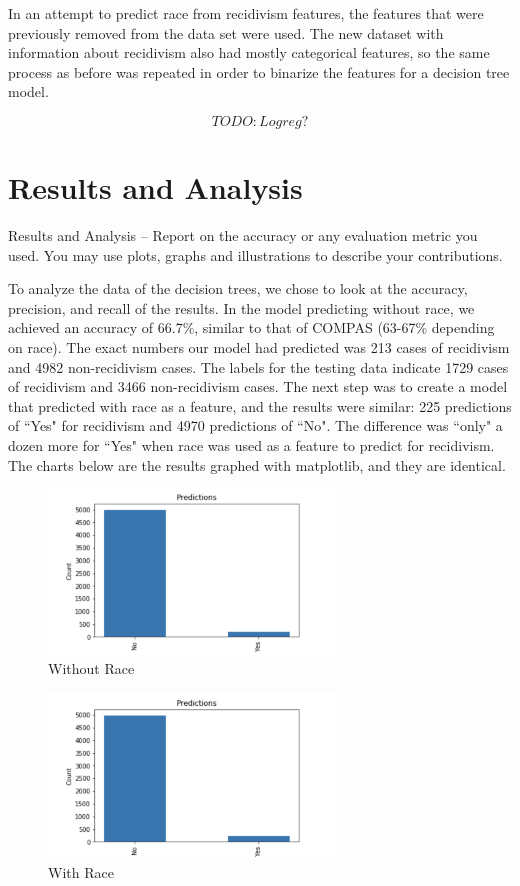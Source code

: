 \documentclass[11pt, sigconf]{acmart}
\begin{document}
In an attempt to predict race from recidivism features, the features that were previously removed from the data set were used. The new dataset with information about recidivism also had mostly categorical features, so the same process as before was repeated in order to binarize the features for a decision tree model.


$$TODO: Logreg ?$$




\section{Results and Analysis}
Results and Analysis – Report on the accuracy or any evaluation metric you used. You may use
plots, graphs and illustrations to describe your contributions.

To analyze the data of the decision trees, we chose to look at the accuracy, precision, and recall of the results. In the model predicting without race, we achieved an accuracy of 66.7\%, similar to that of COMPAS (63-67\% depending on race). The exact numbers our model had predicted was 213 cases of recidivism and 4982 non-recidivism cases. The labels for the testing data indicate 1729 cases of recidivism and 3466 non-recidivism cases. The next step was to create a model that predicted with race as a feature, and the results were similar: 225 predictions of ``Yes" for recidivism and 4970 predictions of ``No". The difference was ``only" a dozen more for ``Yes" when race was used as a feature to predict for recidivism. The charts below are the results graphed with matplotlib, and they are identical. 


\begin{figure}[h] 	
\centering
\includegraphics[width=3in]{2.png}
\caption{Without Race}
\end{figure}

\begin{figure}[h] 	
\centering
\includegraphics[width=3in]{3.png}
\caption{With Race}
\end{figure}
\end{document}
